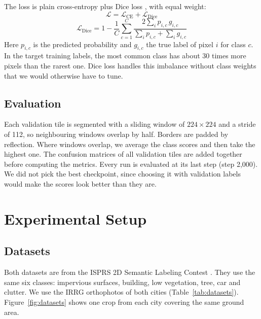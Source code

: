 \documentclass[11pt,a4paper]{report}
\begin{document}
The loss is plain cross-entropy plus Dice loss \cite{milletari2016vnet}, with equal weight:
\begin{equation}
    \mathcal{L} = \mathcal{L}_{\text{CE}} + \mathcal{L}_{\text{Dice}}
\end{equation}
\begin{equation}
    \mathcal{L}_{\text{Dice}} = 1 - \frac{1}{C}\sum_{c=1}^{C} \frac{2\sum_i p_{i,c}\, g_{i,c}}{\sum_i p_{i,c} + \sum_i g_{i,c}}
\end{equation}
Here $p_{i,c}$ is the predicted probability and $g_{i,c}$ the true label of pixel $i$ for class $c$. In the target training labels, the most common class has about 30 times more pixels than the rarest one. Dice loss handles this imbalance without class weights that we would otherwise have to tune.

\section{Evaluation}

Each validation tile is segmented with a sliding window of $224 \times 224$ and a stride of 112, so neighbouring windows overlap by half. Borders are padded by reflection. Where windows overlap, we average the class scores and then take the highest one. The confusion matrices of all validation tiles are added together before computing the metrics. Every run is evaluated at its last step (step 2,000). We did not pick the best checkpoint, since choosing it with validation labels would make the scores look better than they are.

\chapter{Experimental Setup}
\label{ch:setup}

\section{Datasets}

Both datasets are from the ISPRS 2D Semantic Labeling Contest \cite{rottensteiner2012isprs}. They use the same six classes: impervious surfaces, building, low vegetation, tree, car and clutter. We use the IRRG orthophotos of both cities (Table~\ref{tab:datasets}). Figure~\ref{fig:datasets} shows one crop from each city covering the same ground area.
\end{document}
